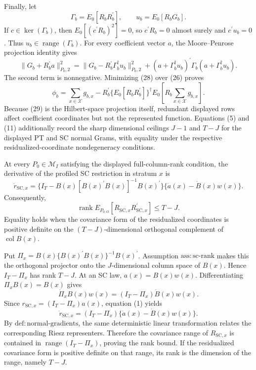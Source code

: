 Finally, let
\[
 \Gamma_b=E_0[R_bR_b^{\prime}],
 \qquad
 u_b=E_0[R_bG_b].
 \tag{27}
\]
If \(c\in\ker(\Gamma_b)\), then \(E_0[(c^{\prime}R_b)^2]=0\), so \(c^{\prime}R_b=0\) almost surely and \(c^{\prime}u_b=0\). Thus \(u_b\in\operatorname{range}(\Gamma_b)\). For every coefficient vector \(a\), the Moore--Penrose projection identity gives
\[
 \|G_b+R_b^{\prime}a\|_{P_0,2}^2
 =\|G_b-R_b^{\prime}\Gamma_b^{\dagger}u_b\|_{P_0,2}^2
 +(a+\Gamma_b^{\dagger}u_b)^{\prime}
   \Gamma_b(a+\Gamma_b^{\dagger}u_b).
 \tag{28}
\]
The second term is nonnegative. Minimizing (28) over (26) proves
\[
 \phi_b
 =\sum_{x\in\mathcal X}g_{b,x}
 -R_b^{\prime}\{E_0[R_bR_b^{\prime}]\}^{\dagger}
 E_0\!\left[R_b\sum_{x\in\mathcal X}g_{b,x}\right].
 \tag{29}
\]
Because (29) is the Hilbert-space projection itself, redundant displayed rows affect coefficient coordinates but not the represented function. Equations (5) and (11) additionally record the sharp dimensional ceilings \(J-1\) and \(T-J\) for the displayed PT and SC normal Grams, with equality under the respective residualized-coordinate nondegeneracy conditions.

At every \(P_0\in\mathcal M_I\) satisfying the displayed full-column-rank condition, the derivative of the profiled SC restriction in stratum \(x\) is
\[
 \dot r_{\mathrm{SC},x}
 =\{I_T-B(x)[B(x)^{\prime}B(x)]^{-1}B(x)^{\prime}\}
   \{\dot a(x)-\dot B(x)w(x)\}.
\]
Consequently,
\[
 \operatorname{rank}E_{P_{0,O}}[R_{\mathrm{SC},x}R_{\mathrm{SC},x}^{\prime}]
 \le T-J.
\]
Equality holds when the covariance form of the residualized coordinates is positive definite on the \((T-J)\)-dimensional orthogonal complement of \(\operatorname{col}B(x)\).

Put \(\Pi_x=B(x)\{B(x)^{\prime}B(x)\}^{-1}B(x)^{\prime}\). Assumption \(\mathrm{ass{:}sc\text{-}rank}\) makes this the orthogonal projector onto the \(J\)-dimensional column space of \(B(x)\). Hence \(I_T-\Pi_x\) has rank \(T-J\). At an SC law, \(a(x)=B(x)w(x)\). Differentiating \(\Pi_xB(x)=B(x)\) gives
\[
 \dot\Pi_xB(x)w(x)=(I_T-\Pi_x)\dot B(x)w(x).
 \tag{1}
\]
Since \(r_{\mathrm{SC},x}=(I_T-\Pi_x)a(x)\), equation (1) yields
\[
 \dot r_{\mathrm{SC},x}
 =(I_T-\Pi_x)\{\dot a(x)-\dot B(x)w(x)\}.
 \tag{2}
\]
By \(\mathrm{def{:}normal\text{-}gradients}\), the same deterministic linear transformation relates the corresponding Riesz representers. Therefore the covariance range of \(R_{\mathrm{SC},x}\) is contained in \(\operatorname{range}(I_T-\Pi_x)\), proving the rank bound. If the residualized covariance form is positive definite on that range, its rank is the dimension of the range, namely \(T-J\).

